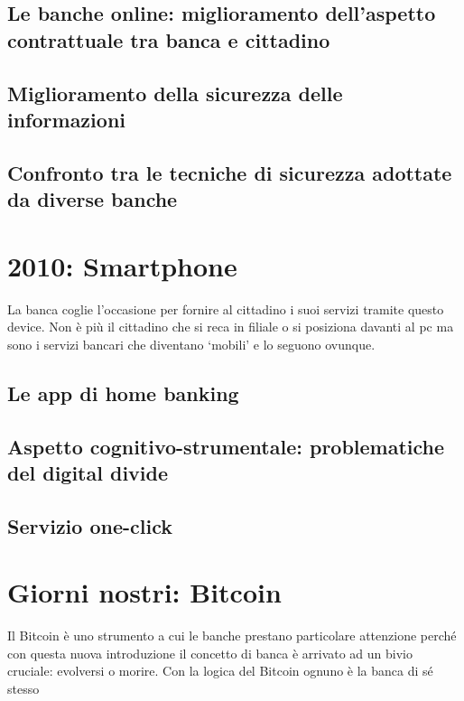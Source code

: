 \documentclass[aip, reprint]{article}
\begin{document}
\subsection{Le banche online: miglioramento dell’aspetto contrattuale tra banca e cittadino}
\subsection{Miglioramento della sicurezza delle informazioni}
\subsection{Confronto tra le tecniche di sicurezza adottate da diverse banche}


\newpage
\section{2010: Smartphone}
La banca coglie l’occasione per fornire al cittadino i suoi servizi tramite questo device. Non è più il cittadino che si reca in filiale o si posiziona davanti al pc ma sono i servizi bancari che diventano ‘mobili’ e lo seguono ovunque.

\subsection{Le app di home banking}
\subsection{Aspetto cognitivo-strumentale: problematiche del digital divide}
\subsection{Servizio one-click}


\newpage
\section{Giorni nostri: Bitcoin}
Il Bitcoin è uno strumento a cui le banche prestano particolare attenzione perché con questa nuova introduzione il concetto di banca è arrivato ad un bivio cruciale: evolversi o morire.
Con la logica del Bitcoin ognuno è la banca di sé stesso 
\end{document}

